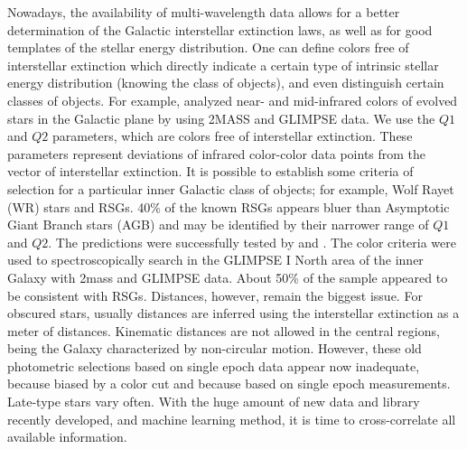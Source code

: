 \documentclass[final,11pt,onecolumn,a4paper,twoside]{scrbook_gj}
\begin{document}
Nowadays, the availability of multi-wavelength data
allows for a better determination of the Galactic 
interstellar extinction laws, as well as for  good
templates of the stellar energy distribution.
One can define colors free of interstellar extinction which
directly indicate a certain type of intrinsic
stellar energy distribution (knowing the class of objects),
and even  distinguish  certain classes of objects. 
For example,  \citet{messineo12} analyzed near- 
and mid-infrared colors of evolved 
stars in the Galactic plane by using 2MASS and GLIMPSE data. 
We use the $Q1$ and $Q2$ parameters, which are colors
free of interstellar extinction. 
These parameters represent deviations 
of infrared color-color data points from the vector 
of interstellar extinction. 
It is possible to establish some criteria of selection 
for a particular inner Galactic class of objects; 
for example, Wolf Rayet (WR) stars and RSGs.  
40\% of the known RSGs 
appears bluer than Asymptotic Giant Branch 
stars (AGB) and may be identified  by their narrower 
range of $Q1$ and $Q2$.
The predictions were successfully tested
by \citet{messineo16} and \citet{messineo17}.
The color criteria were used to spectroscopically search 
in the GLIMPSE I North area of the inner Galaxy
with 2mass and GLIMPSE data.
About 50\% of the sample appeared to be consistent with 
RSGs. Distances, however, remain the biggest issue.
For obscured stars, usually distances are inferred 
using the interstellar extinction as a meter of distances.
Kinematic distances are not allowed in the central regions, 
being the Galaxy characterized by  non-circular motion.
However, these old photometric selections
based on  single epoch data appear now
 inadequate, because biased by a color cut and because based
on single epoch measurements.
Late-type stars vary often.
With the huge amount of new data and library recently developed,
and machine learning method, it is time to cross-correlate
all available information. 
\end{document}
